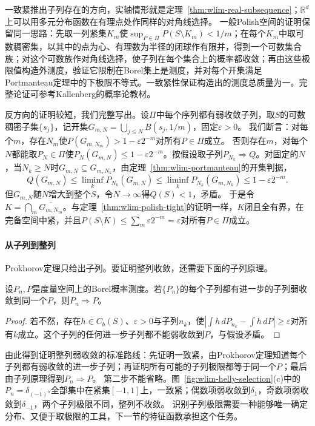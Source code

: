 一致紧推出子列存在的方向，实轴情形就是定理~\ref{thm:wlim-real-subsequence}；$\mathbb R^d$上可以用多元分布函数在有理点处作同样的对角线选择。
一般Polish空间的证明保留同一思路：先取一列紧集$K_m$使$\sup_{P\in\Pi}P(S\setminus K_m)<1/m$；在每个$K_m$中取可数稠密集，以其中的点为心、有理数为半径的闭球作有限并，得到一个可数集合族；对这个可数族作对角线选择，使子列在每个集合上的概率都收敛；再由这些极限值构造外测度，验证它限制在Borel集上是测度，并对每个开集满足Portmanteau定理中的下极限不等式。一致紧性保证构造出的测度总质量为一。完整论证可参考Kallenberg的概率论教材。

反方向的证明较短，我们完整写出。设$\Pi$中每个序列都有弱收敛子列，取$S$的可数稠密子集$\{s_j\}$，记开集$G_{m,N}=\bigcup_{j\leq N}B(s_j,1/m)$，固定$\varepsilon>0$。
我们断言：对每个$m$，存在$N_m$使$P(G_{m,N_m})>1-\varepsilon2^{-m}$对所有$P\in\Pi$成立。
否则存在$m$，对每个$N$都能取$P_N\in\Pi$使$P_N(G_{m,N})\leq1-\varepsilon2^{-m}$。按假设取子列$P_{N_k}\Rightarrow Q$。对固定的$N$，当$N_k\geq N$时$G_{m,N}\subseteq G_{m,N_k}$，由定理~\ref{thm:wlim-portmanteau}的开集判据，
\[
  Q(G_{m,N})\leq\liminf_kP_{N_k}(G_{m,N})\leq\liminf_kP_{N_k}(G_{m,N_k})\leq1-\varepsilon2^{-m}.
\]
但$G_{m,N}$随$N$增大到整个$S$，令$N\to\infty$得$Q(S)<1$，矛盾。
于是令$K=\bigcap_m\overline{G_{m,N_m}}$。与定理~\ref{thm:wlim-polish-tight}的证明一样，$K$闭且全有界，在完备空间中紧，并且$P(S\setminus K)\leq\sum_m\varepsilon2^{-m}=\varepsilon$对所有$P\in\Pi$成立。

\paragraph{从子列到整列}
Prokhorov定理只给出子列。要证明整列收敛，还需要下面的子列原理。

\begin{lemma}[子列原理]
\label{lem:wlim-subsequence-principle}
设$P_n,P$是度量空间上的Borel概率测度。若$\{P_n\}$的每个子列都有进一步的子列弱收敛到同一个$P$，则$P_n\Rightarrow P$。
\end{lemma}

\begin{proof}
若不然，存在$h\in C_b(S)$、$\varepsilon>0$与子列$n_k$，使$|\int h\,dP_{n_k}-\int h\,dP|\geq\varepsilon$对所有$k$成立。这个子列的任何进一步子列都不能弱收敛到$P$，与假设矛盾。
\end{proof}

由此得到证明整列弱收敛的标准路线：先证明一致紧，由Prokhorov定理知道每个子列都有弱收敛的进一步子列；再证明所有可能的子列极限都等于同一个$P$；最后由子列原理得到$P_n\Rightarrow P$。
第二步不能省略。图~\ref{fig:wlim-helly-selection}(c)中的$P_n=\delta_{(-1)^n}$全部集中在紧集$[-1,1]$上，一致紧；偶数项弱收敛到$\delta_1$，奇数项弱收敛到$\delta_{-1}$，两个子列极限不同，整列不收敛。
识别子列极限需要一种能够唯一确定分布、又便于取极限的工具，下一节的特征函数承担这个任务。

